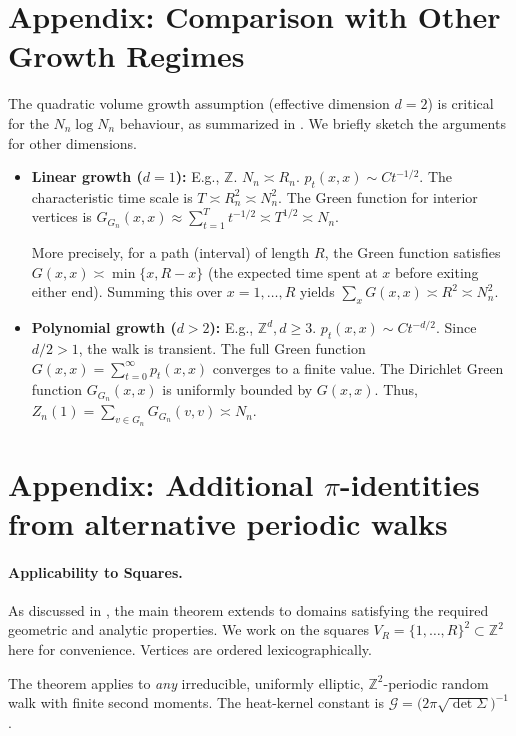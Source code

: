 \documentclass{article}
\numberwithin{equation}{section}
\theoremstyle{definition}
\theoremstyle{remark}
\newcommand{\cG}{\mathcal{G}}
\begin{document}
\appendix

\section{Appendix: Comparison with Other Growth Regimes}\label{app:growth}
The quadratic volume growth assumption (effective dimension $d=2$) is critical for the $N_n \log N_n$ behaviour, as summarized in . We briefly sketch the arguments for other dimensions.

\begin{itemize}
\item \textbf{Linear growth ($d=1$):} E.g., $\mathbb{Z}$. $N_n \asymp R_n$. $p_t(x,x) \sim C t^{-1/2}$. The characteristic time scale is $T \asymp R_n^2 \asymp N_n^2$. The Green function for interior vertices is $G_{G_n}(x,x) \approx \sum_{t=1}^{T} t^{-1/2} \asymp T^{1/2} \asymp N_n$.

More precisely, for a path (interval) of length $R$, the Green function satisfies $G(x,x) \asymp \min\{x, R-x\}$ (the expected time spent at $x$ before exiting either end). Summing this over $x=1,\dots,R$ yields $\sum_x G(x,x) \asymp R^2 \asymp N_n^2$.


\item \textbf{Polynomial growth ($d>2$):} E.g., $\mathbb{Z}^d, d\geq 3$. $p_t(x,x) \sim C t^{-d/2}$. Since $d/2 > 1$, the walk is transient. The full Green function $G(x,x) = \sum_{t=0}^{\infty} p_t(x,x)$ converges to a finite value. The Dirichlet Green function $G_{G_n}(x,x)$ is uniformly bounded by $G(x,x)$. Thus, $Z_n(1) = \sum_{v \in G_n} G_{G_n}(v,v) \asymp N_n$.
\end{itemize}


\section{Appendix: Additional $\pi$-identities from alternative periodic walks}
\label{app:alt_pi}

\paragraph{Applicability to Squares.}
As discussed in , the main theorem extends to domains satisfying the required geometric and analytic properties. We work on the squares $V_R=\{1,\dots,R\}^2 \subset \mathbb{Z}^2$ here for convenience. Vertices are ordered lexicographically.
\medskip

The theorem applies to \emph{any} irreducible, uniformly elliptic,
$\mathbb{Z}^{2}$-periodic random walk with finite second moments.
The heat-kernel constant is
$\displaystyle\cG=\bigl(2\pi\sqrt{\det\Sigma}\bigr)^{-1}$.
\end{document}
